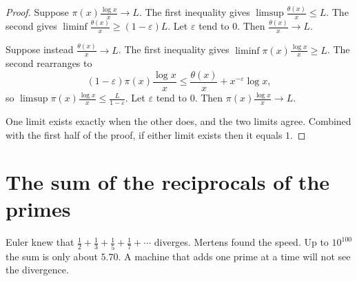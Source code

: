 \begin{proof}
Suppose $\pi(x)\frac{\log x}x\to L$. The first inequality gives $\limsup\frac{\theta(x)}x\le L$. The second gives $\liminf\frac{\theta(x)}x\ge(1-\varepsilon)L$. Let $\varepsilon$ tend to $0$. Then $\frac{\theta(x)}x\to L$.

Suppose instead $\frac{\theta(x)}x\to L$. The first inequality gives $\liminf\pi(x)\frac{\log x}x\ge L$. The second rearranges to
\[
(1-\varepsilon)\pi(x)\frac{\log x}x\le\frac{\theta(x)}x+x^{-\varepsilon}\log x,
\]
so $\limsup\pi(x)\frac{\log x}x\le\frac L{1-\varepsilon}$. Let $\varepsilon$ tend to $0$. Then $\pi(x)\frac{\log x}x\to L$.

One limit exists exactly when the other does, and the two limits agree. Combined with the first half of the proof, if either limit exists then it equals $1$.
\end{proof}

\section{The sum of the reciprocals of the primes}

Euler knew that $\frac12+\frac13+\frac15+\frac17+\cdots$ diverges. Mertens found the speed. Up to $10^{100}$ the sum is only about $5.70$. A machine that adds one prime at a time will not see the divergence.

